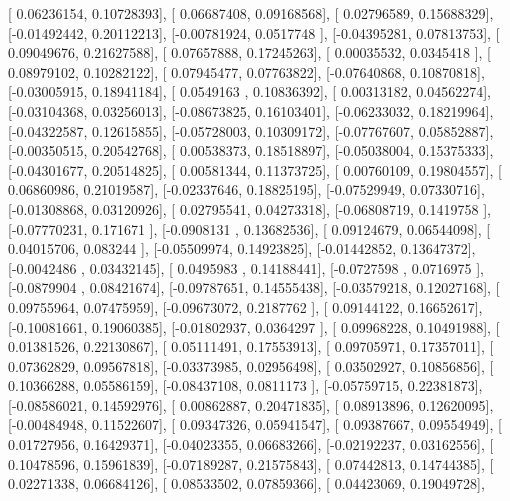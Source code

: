 \documentclass{article}
\begin{document}
       [ 0.06236154,  0.10728393],
       [ 0.06687408,  0.09168568],
       [ 0.02796589,  0.15688329],
       [-0.01492442,  0.20112213],
       [-0.00781924,  0.0517748 ],
       [-0.04395281,  0.07813753],
       [ 0.09049676,  0.21627588],
       [ 0.07657888,  0.17245263],
       [ 0.00035532,  0.0345418 ],
       [ 0.08979102,  0.10282122],
       [ 0.07945477,  0.07763822],
       [-0.07640868,  0.10870818],
       [-0.03005915,  0.18941184],
       [ 0.0549163 ,  0.10836392],
       [ 0.00313182,  0.04562274],
       [-0.03104368,  0.03256013],
       [-0.08673825,  0.16103401],
       [-0.06233032,  0.18219964],
       [-0.04322587,  0.12615855],
       [-0.05728003,  0.10309172],
       [-0.07767607,  0.05852887],
       [-0.00350515,  0.20542768],
       [ 0.00538373,  0.18518897],
       [-0.05038004,  0.15375333],
       [-0.04301677,  0.20514825],
       [ 0.00581344,  0.11373725],
       [ 0.00760109,  0.19804557],
       [ 0.06860986,  0.21019587],
       [-0.02337646,  0.18825195],
       [-0.07529949,  0.07330716],
       [-0.01308868,  0.03120926],
       [ 0.02795541,  0.04273318],
       [-0.06808719,  0.1419758 ],
       [-0.07770231,  0.171671  ],
       [-0.0908131 ,  0.13682536],
       [ 0.09124679,  0.06544098],
       [ 0.04015706,  0.083244  ],
       [-0.05509974,  0.14923825],
       [-0.01442852,  0.13647372],
       [-0.0042486 ,  0.03432145],
       [ 0.0495983 ,  0.14188441],
       [-0.0727598 ,  0.0716975 ],
       [-0.0879904 ,  0.08421674],
       [-0.09787651,  0.14555438],
       [-0.03579218,  0.12027168],
       [ 0.09755964,  0.07475959],
       [-0.09673072,  0.2187762 ],
       [ 0.09144122,  0.16652617],
       [-0.10081661,  0.19060385],
       [-0.01802937,  0.0364297 ],
       [ 0.09968228,  0.10491988],
       [ 0.01381526,  0.22130867],
       [ 0.05111491,  0.17553913],
       [ 0.09705971,  0.17357011],
       [ 0.07362829,  0.09567818],
       [-0.03373985,  0.02956498],
       [ 0.03502927,  0.10856856],
       [ 0.10366288,  0.05586159],
       [-0.08437108,  0.0811173 ],
       [-0.05759715,  0.22381873],
       [-0.08586021,  0.14592976],
       [ 0.00862887,  0.20471835],
       [ 0.08913896,  0.12620095],
       [-0.00484948,  0.11522607],
       [ 0.09347326,  0.05941547],
       [ 0.09387667,  0.09554949],
       [ 0.01727956,  0.16429371],
       [-0.04023355,  0.06683266],
       [-0.02192237,  0.03162556],
       [ 0.10478596,  0.15961839],
       [-0.07189287,  0.21575843],
       [ 0.07442813,  0.14744385],
       [ 0.02271338,  0.06684126],
       [ 0.08533502,  0.07859366],
       [ 0.04423069,  0.19049728],
\end{document}
